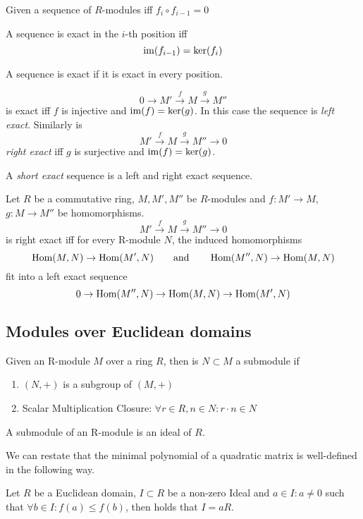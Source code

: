 \begin{definition}
   Given a sequence of \(R\)-modules iff \(f_i \circ f_{i-1} = 0\)
\end{definition}

\begin{definition}[Exact]
   A sequence is exact in the \(i\)-th position iff
   \[\operatorname{im}(f_{i-1}) = \ker(f_i)\]
\end{definition}

\begin{definition}
   A sequence is exact if it is exact in every position.
\end{definition}
\begin{example}
   \[0 \to M' \xrightarrow{f} M \xrightarrow{g} M''\]
   is exact iff \(f\) is injective and \(\operatorname{im}(f) = \ker(g)\).
   In this case the sequence is \emph{left exact}.
   Similarly is
   \[M' \xrightarrow{f} M \xrightarrow{g} M'' \to 0\]
   \emph{right exact} iff \(g\) is surjective and \(\operatorname{im}(f) = \ker(g)\).

   A \emph{short exact} sequence is a left and right exact sequence.
\end{example}

\begin{proposition}
   Let \(R\) be a commutative ring, \(M, M', M''\) be \(R\)-modules and \(f: M' \to M\), \(g: M \to M''\) be homomorphisms.
   \[M' \xrightarrow{f} M \xrightarrow{g} M'' \to 0\]
   is right exact iff for every R-module \(N\), the induced homomorphisms
   \[\operatorname{Hom}(M,N) \to \operatorname{Hom}(M', N) \qquad\text{and}\qquad \operatorname{Hom}(M'', N) \to \operatorname{Hom}(M, N)\]
   fit into a left exact sequence
   \[0 \to \operatorname{Hom}(M'',N) \to \operatorname{Hom}(M, N) \to \operatorname{Hom}(M', N)\]
\end{proposition}

\subsection{Modules over Euclidean domains}
\begin{definition}[Submodule]\label{def:submodule}
   Given an R-module \(M\) over a ring \(R\), then is \(N \subset M\) a submodule if
   \begin{enumerate}[label=\roman*, align=Center]
      \item \((N, +)\) is a subgroup of \((M, +)\)
      \item Scalar Multiplication Closure: \(\forall r \in R, n \in N: r \cdot n \in N\)
   \end{enumerate}
\end{definition}
\begin{remark}
   A submodule of an R-module is an ideal of \(R\).
\end{remark}
\begin{remark}
   We can restate that the minimal polynomial of a quadratic matrix is well-defined in the following way.

   Let \(R\) be a Euclidean domain, \(I \subset R\) be a non-zero Ideal and \(a \in I: a \neq 0\) such that
   \(\forall b \in I: f(a) \leq f(b)\), then holds that \(I = a R\).
\end{remark}

